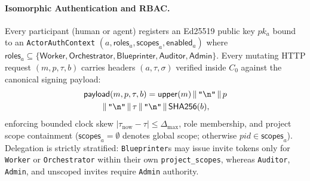 \documentclass[sigplan,nonacm,10pt]{acmart}
\newcommand{\kw}[1]{\mathsf{#1}}
\newcommand{\code}[1]{\texttt{#1}}
\begin{document}
\paragraph{Isomorphic Authentication and RBAC.}
Every participant (human or agent) registers an Ed25519 public key $pk_a$ bound to an \code{Actor\-Auth\-Context} $(a, \kw{roles}_a, \kw{scopes}_a, \kw{enabled}_a)$ where $\kw{roles}_a \subseteq \{\kw{Worker},\allowbreak \kw{Orchestrator},\allowbreak \kw{Blueprinter},\allowbreak \kw{Auditor},\allowbreak \kw{Admin}\}$. Every mutating HTTP request $(m, p, \tau, b)$ carries headers $(a, \tau, \sigma)$ verified inside $C_0$ against the canonical signing payload:
\begin{multline*}
\kw{payload}(m, p, \tau, b) = \kw{upper}(m) \,\|\, \text{\code{"\textbackslash n"}} \,\|\, p \\
  \,\|\, \text{\code{"\textbackslash n"}} \,\|\, \tau \,\|\, \text{\code{"\textbackslash n"}} \,\|\, \kw{SHA256}(b),
\end{multline*}
enforcing bounded clock skew $|\tau_{\mathrm{now}} - \tau| \le \Delta_{\max}$, role membership, and project scope containment ($\kw{scopes}_a = \emptyset$ denotes global scope; otherwise $pid \in \kw{scopes}_a$). Delegation is strictly stratified: \code{Blueprinter}s may issue invite tokens only for \code{Worker} or \code{Orchestrator} within their own \code{project\_scopes}, whereas \code{Auditor}, \code{Admin}, and unscoped invites require \code{Admin} authority.
\end{document}
